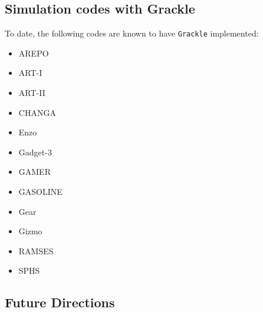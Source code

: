 \subsection{Simulation codes with Grackle}
To date, the following codes are known to have \texttt{Grackle}
implemented:
\begin{itemize}

\item AREPO \citep{2010MNRAS.401..791S}

\item ART-I \citep{1999PhDT........25K, 2002ApJ...571..563K}

\item ART-II \citep{2008ApJ...672...19R}

\item CHANGA \citep{2004NewA....9..137W, 2006MNRAS.373.1074S}

\item Enzo \citep{2014ApJS..211...19B}

\item Gadget-3 \citep{2005MNRAS.364.1105S}

\item GAMER \citep{2010ApJS..186..457S}

\item GASOLINE \citep{2004NewA....9..137W}

\item Gear \citep{2012A&A...538A..82R, 2012ASPC..453..141R}

\item Gizmo \citep{2015MNRAS.450...53H}

\item RAMSES \citep{2002A&A...385..337T}

\item SPHS \citep{2012MNRAS.422.3037R}

\end{itemize}

\subsection{Future Directions} \label{Future_Directions}

